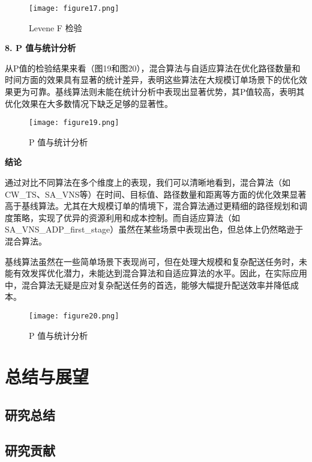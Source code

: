 \documentclass[12pt,a4paper,twoside]{ctexbook}
\let\oldchapter\chapter
\renewcommand{\chapter}{\clearpage\oldchapter}  %
\begin{document}
\begin{figure}[H]
    \centering
    \texttt{[image: figure17.png]} %
    \caption{Levene F 检验}
    \label{fig:levene_f_test}
\end{figure}

\textbf{8. P 值与统计分析}

从P值的检验结果来看（图19和图20），混合算法与自适应算法在优化路径数量和时间方面的效果具有显著的统计差异，表明这些算法在大规模订单场景下的优化效果更为可靠。基线算法则未能在统计分析中表现出显著优势，其P值较高，表明其优化效果在大多数情况下缺乏足够的显著性。

\begin{figure}[H]
    \centering
    \texttt{[image: figure19.png]} %
    \caption{P 值与统计分析}
    \label{fig:p_value_analysis}
\end{figure}

\textbf{结论}

通过对比不同算法在多个维度上的表现，我们可以清晰地看到，混合算法（如CW\_TS、SA\_VNS等）在时间、目标值、路径数量和距离等方面的优化效果显著高于基线算法。尤其在大规模订单的情境下，混合算法通过更精细的路径规划和调度策略，实现了优异的资源利用和成本控制。而自适应算法（如SA\_VNS\_ADP\_first\_stage）虽然在某些场景中表现出色，但总体上仍然略逊于混合算法。

基线算法虽然在一些简单场景下表现尚可，但在处理大规模和复杂配送任务时，未能有效发挥优化潜力，未能达到混合算法和自适应算法的水平。因此，在实际应用中，混合算法无疑是应对复杂配送任务的首选，能够大幅提升配送效率并降低成本。

\begin{figure}[H]
    \centering
    \texttt{[image: figure20.png]} %
    \caption{P 值与统计分析}
    \label{fig:p_value_analysis_final}
\end{figure}
\backmatter

\chapter{总结与展望}

\section{研究总结}

\section{研究贡献}
\end{document}
